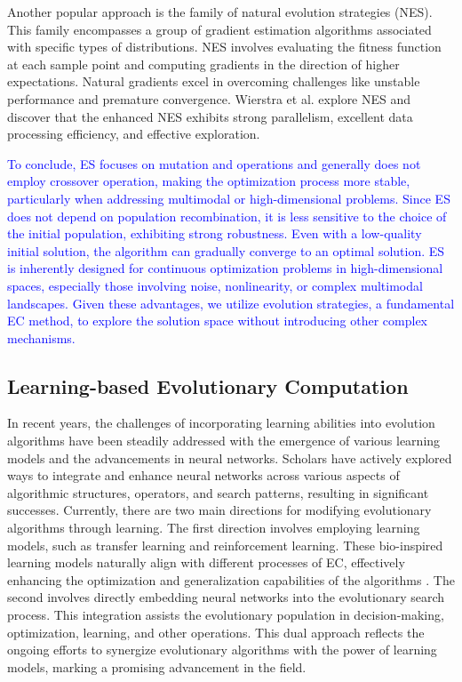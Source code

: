 \documentclass[journal,twoside]{IEEEtran}
\begin{document}
Another popular approach is the family of natural evolution strategies (NES). This family encompasses a group of gradient estimation algorithms associated with specific types of distributions. NES involves evaluating the fitness function at each sample point and computing gradients in the direction of higher expectations. Natural gradients excel in overcoming challenges like unstable performance and premature convergence. Wierstra et al. \cite{wierstra2014natural} explore NES and discover that the enhanced NES exhibits strong parallelism, excellent data processing efficiency, and effective exploration.

\textcolor{blue}{
To conclude, ES focuses on mutation and operations and generally does not employ crossover operation, making the optimization process more stable, particularly when addressing multimodal or high-dimensional problems. Since ES does not depend on population recombination, it is less sensitive to the choice of the initial population, exhibiting strong robustness. Even with a low-quality initial solution, the algorithm can gradually converge to an optimal solution. ES is inherently designed for continuous optimization problems in high-dimensional spaces, especially those involving noise, nonlinearity, or complex multimodal landscapes. Given these advantages, we utilize evolution strategies, a fundamental EC method, to explore the solution space without introducing other complex mechanisms.
}

\subsection{Learning-based Evolutionary Computation}
In recent years, the challenges of incorporating learning abilities into evolution algorithms have been steadily addressed with the emergence of various learning models and the advancements in neural networks. Scholars have actively explored ways to integrate and enhance neural networks across various aspects of algorithmic structures, operators, and search patterns, resulting in significant successes. Currently, there are two main directions for modifying evolutionary algorithms through learning. The first direction involves employing learning models, such as transfer learning and reinforcement learning. These bio-inspired learning models naturally align with different processes of EC, effectively enhancing the optimization and generalization capabilities of the algorithms \cite{yangyuDE2018}. The second involves directly embedding neural networks into the evolutionary search process. This integration assists the evolutionary population in decision-making, optimization, learning, and other operations. This dual approach reflects the ongoing efforts to synergize evolutionary algorithms with the power of learning models, marking a promising advancement in the field.
\end{document}
